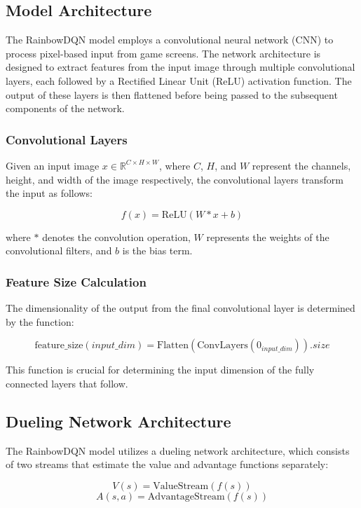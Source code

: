\documentclass[12pt,a4paper]{article}
\begin{document}
\subsection{Model Architecture}

The RainbowDQN model employs a convolutional neural network (CNN) to process pixel-based input from game screens. The network architecture is designed to extract features from the input image through multiple convolutional layers, each followed by a Rectified Linear Unit (ReLU) activation function. The output of these layers is then flattened before being passed to the subsequent components of the network.

\subsubsection{Convolutional Layers}

Given an input image $x \in \mathbb{R}^{C \times H \times W}$, where $C$, $H$, and $W$ represent the channels, height, and width of the image respectively, the convolutional layers transform the input as follows:

\[
f(x) = \text{ReLU}(W * x + b)
\]

where $*$ denotes the convolution operation, $W$ represents the weights of the convolutional filters, and $b$ is the bias term.

\subsubsection{Feature Size Calculation}

The dimensionality of the output from the final convolutional layer is determined by the function:

\[
\text{feature\_size}(input\_dim) = \text{Flatten}(\text{ConvLayers}(0_{input\_dim})).size
\]

This function is crucial for determining the input dimension of the fully connected layers that follow.

\subsection{Dueling Network Architecture}

The RainbowDQN model utilizes a dueling network architecture, which consists of two streams that estimate the value and advantage functions separately:

\[
V(s) = \text{ValueStream}(f(s))
\]
\[
A(s, a) = \text{AdvantageStream}(f(s))
\]
\end{document}
